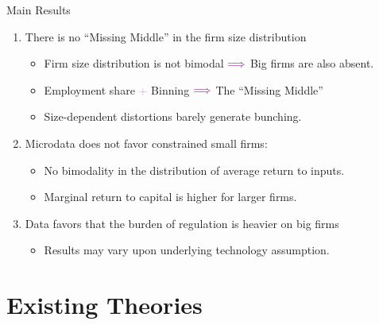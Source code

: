 \documentclass[usenames,dvipsnames,aspectratio=32]{beamer}
\begin{document}
\begin{frame}{Main Results}
    \begin{enumerate}[label=\textbf{\textcolor{violet}{\arabic*.}}]
        \item There is no ``Missing Middle'' in the firm size distribution
        \begin{itemize}[label=\textcolor{violet}{$\blacktriangleright$}]
            \item Firm size distribution is not bimodal $\textcolor{violet}{\Longrightarrow}$ Big firms are also absent.
            \item Employment share \textcolor{violet}{+} Binning $\textcolor{violet}{\Longrightarrow}$ The ``Missing Middle'' 
            \item Size-dependent distortions barely generate bunching. 
        \end{itemize}
        \vfill
        \item Microdata does not favor constrained small firms:
        \begin{itemize}[label=\textcolor{violet}{$\blacktriangleright$}]
            \item No bimodality in the distribution of average return to inputs. 
            \item Marginal return to capital is higher for larger firms. 
        \end{itemize}            
        \vfill
        \item Data favors that the burden of regulation is heavier on big firms
        \begin{itemize}[label=\textcolor{violet}{$\blacktriangleright$}]
            \item Results may vary upon underlying technology assumption. 
        \end{itemize}
    \end{enumerate}
\end{frame}

\section{Existing Theories}
\end{document}

